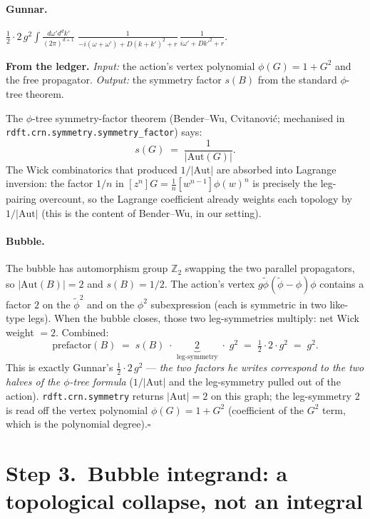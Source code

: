 \documentclass[11pt,a4paper]{article}
\begin{document}
\paragraph{Gunnar.}
$\frac{1}{2}\!\cdot\! 2\,g^{2}\!\int\!\!\frac{d\omega' d^{d}k'}{(2\pi)^{d+1}}\;
\frac{1}{-i(\omega+\omega')+D(k+k')^{2}+r}\,\frac{1}{i\omega'+Dk'^{2}+r}$.

\begin{cfacbox}
\textbf{From the ledger.} \emph{Input:} the action's vertex polynomial $\phi(G) = 1+G^{2}$
and the free propagator. \emph{Output:} the symmetry factor $s(B)$ from the standard
$\phi$-tree theorem.

\medskip
The $\phi$-tree symmetry-factor theorem (Bender--Wu, Cvitanovi\'c; mechanised in
\texttt{rdft.crn.symmetry.symmetry\_factor}) says:
\[
\boxed{\;s(G) \;=\; \frac{1}{|\mathrm{Aut}(G)|}.\;}
\]
The Wick combinatorics that produced $1/|\mathrm{Aut}|$ are absorbed into Lagrange
inversion: the factor $1/n$ in $[z^{n}]G = \tfrac{1}{n}[w^{n-1}]\phi(w)^{n}$ is precisely
the leg-pairing overcount, so the Lagrange coefficient already weights each topology by
$1/|\mathrm{Aut}|$ (this is the content of Bender--Wu, in our setting).

\paragraph{Bubble.} The bubble has automorphism group $\mathbb Z_{2}$ swapping the two
parallel propagators, so $|\mathrm{Aut}(B)| = 2$ and $s(B) = 1/2$. The action's vertex
$g\widetilde\phi(\widetilde\phi-\phi)\phi$ contains a factor $2$ on the $\widetilde\phi^{2}$
and on the $\phi^{2}$ subexpression (each is symmetric in two like-type legs). When the
bubble closes, those two leg-symmetries multiply: net Wick weight $= 2$. Combined:
\[
\text{prefactor}(B) \;=\; s(B)\;\cdot\;\underbrace{2}_{\text{leg-symmetry}}\;\cdot\; g^{2}
\;=\; \tfrac{1}{2}\cdot 2 \cdot g^{2} \;=\; g^{2}.
\]
This is exactly Gunnar's $\tfrac{1}{2}\!\cdot\!2\,g^{2}$ — \emph{the two factors he writes
correspond to the two halves of the $\phi$-tree formula} ($1/|\mathrm{Aut}|$ and the
leg-symmetry pulled out of the action). \texttt{rdft.crn.symmetry} returns $|\mathrm{Aut}|=2$
on this graph; the leg-symmetry $2$ is read off the vertex polynomial $\phi(G) = 1+G^{2}$
(coefficient of the $G^{2}$ term, which is the polynomial degree).\hfill$\square$
\end{cfacbox}

\section*{Step 3.\ Bubble integrand: a topological collapse, not an integral}
\end{document}
